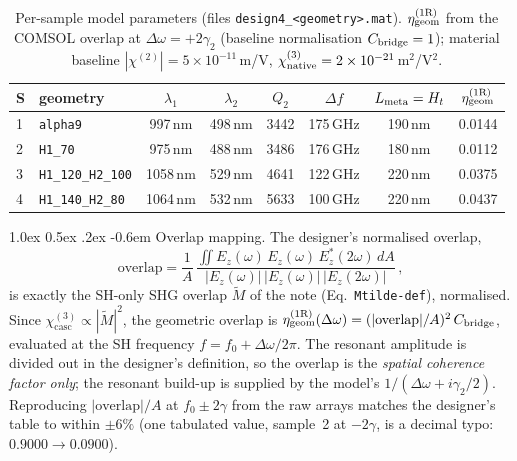 \documentclass[11pt,a4paper]{article}
\makeatletter
\newcommand{\chitwo}{\chi^{(2)}}
\newcommand{\chithree}{\chi^{(3)}}
\newcommand{\Dom}{\Delta\omega}
\newcommand{\geom}{{\rm geom}}
\newcommand{\chicasc}{\chithree_{\text{casc}}}
\newcommand{\etag}{\eta_{\geom}^{(1\mathrm R)}}
\renewcommand\paragraph{%
  \@startsection{paragraph}{4}{\z@}%
                {1.0ex \@plus 0.5ex \@minus .2ex}%
                {-0.6em}%
                {\normalfont\itshape}}
\makeatother
\begin{document}
\begin{table}[H]
  \centering
  \caption{Per-sample model parameters (files \texttt{design4\_<geometry>.mat}).
  $\etag$ from the COMSOL overlap at $\Dom=+2\gamma_2$ (baseline normalisation
  $C_{\rm bridge}=1$); material baseline $|\chitwo|=5\times10^{-11}\,$m/V,
  $\chithree_{\rm native}=2\times10^{-21}\,$m$^2$/V$^2$.}
  \label{tab:params}
  \small
  \setlength{\tabcolsep}{5pt}
  \begin{tabular}{llcccccc}
    \toprule
    S & geometry & $\lambda_1$ & $\lambda_2$ & $Q_2$ &
      $\Delta f$ & $L_{\rm meta}=H_t$ & $\etag$ \\
    \midrule
    1 & \texttt{alpha9}          & 997\,nm  & 498\,nm & 3442 & 175\,GHz & 190\,nm & 0.0144 \\
    2 & \texttt{H1\_70}          & 975\,nm  & 488\,nm & 3486 & 176\,GHz & 180\,nm & 0.0112 \\
    3 & \texttt{H1\_120\_H2\_100} & 1058\,nm & 529\,nm & 4641 & 122\,GHz & 220\,nm & 0.0375 \\
    4 & \texttt{H1\_140\_H2\_80}  & 1064\,nm & 532\,nm & 5633 & 100\,GHz & 220\,nm & 0.0437 \\
    \bottomrule
  \end{tabular}
\end{table}

\paragraph{Overlap mapping.}
The designer's normalised overlap,
\begin{equation*}
  \text{overlap}=\frac{1}{A}\,
    \frac{\iint E_z(\omega)\,E_z(\omega)\,E_z^{*}(2\omega)\,dA}
         {|E_z(\omega)|\,|E_z(\omega)|\,|E_z(2\omega)|}\,,
\end{equation*}
is exactly the SH-only SHG overlap $\widetilde M$ of the note
(Eq.~\texttt{Mtilde-def}), normalised. Since $\chicasc\propto|\widetilde M|^2$, the
geometric overlap is $\etag(\Dom)=(|\text{overlap}|/A)^2\,C_{\rm bridge}$,
evaluated at the SH frequency $f=f_0+\Dom/2\pi$. The resonant amplitude is
divided out in the designer's definition, so the overlap is the \emph{spatial
coherence factor only}; the resonant build-up is supplied by the model's
$1/(\Dom+i\gamma_2/2)$. Reproducing $|\text{overlap}|/A$ at $f_0\pm2\gamma$ from
the raw arrays matches the designer's table to within $\pm6\%$ (one tabulated
value, sample~2 at $-2\gamma$, is a decimal typo: $0.9000\to0.0900$).

\end{document}
